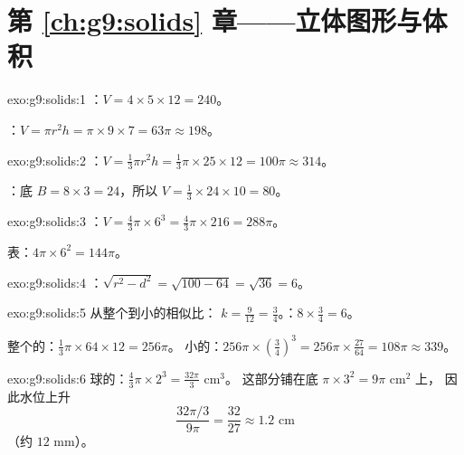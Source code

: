 \section*{第 \ref{ch:g9:solids} 章——立体图形与体积}

\begin{solution}{exo:g9:solids:1}
：$V = 4 \times 5 \times 12 = 240$。

：$V = \pi r^2 h = \pi \times 9 \times 7 = 63\pi \approx 198$。
\end{solution}

\begin{solution}{exo:g9:solids:2}
：$V = \frac13 \pi r^2 h = \frac13 \pi \times 25 \times 12 =
100\pi \approx 314$。

：底 $B = 8 \times 3 = 24$，所以
$V = \frac13 \times 24 \times 10 = 80$。
\end{solution}

\begin{solution}{exo:g9:solids:3}
：$V = \frac43 \pi \times 6^3 = \frac43 \pi \times 216 = 288\pi$。

表：$4\pi \times 6^2 = 144\pi$。
\end{solution}

\begin{solution}{exo:g9:solids:4}
：$\sqrt{r^2 - d^2} = \sqrt{100 - 64} = \sqrt{36}
= 6$。
\end{solution}

\begin{solution}{exo:g9:solids:5}
从整个到小的相似比：
$k = \frac{9}{12} = \frac34$。：$8 \times \frac34 = 6$。

整个的：$\frac13\pi \times 64 \times 12 = 256\pi$。
小的：$256\pi \times \left(\frac34\right)^3 =
256\pi \times \frac{27}{64} = 108\pi \approx 339$。
\end{solution}

\begin{solution}{exo:g9:solids:6}
球的：$\frac43\pi \times 2^3 = \frac{32\pi}{3}$ cm$^3$。
这部分铺在底 $\pi \times 3^2 = 9\pi$ cm$^2$ 上，
因此水位上升
\[
\frac{32\pi/3}{9\pi} = \frac{32}{27} \approx 1.2 \text{ cm}
\]
（约 $12$ mm）。
\end{solution}

